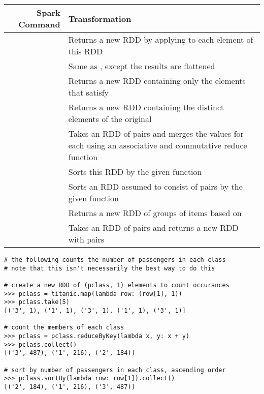 \begin{table}[H]
\begin{tabular}{|r|C|}
\hline
\textbf{Spark Command} & \textbf{Transformation} \\
\hline
{} &  Returns a new RDD by applying  to each element of this RDD \\
\hline
{} & Same as , except the results are flattened \\
\hline
{} & Returns a new RDD containing only the elements that satisfy  \\
\hline
{} & Returns a new RDD containing the distinct elements of the original\\
\hline
{} & Takes an RDD of  pairs and merges the values for each  using an associative and commutative reduce function  \\
\hline
{} & Sorts this RDD by the given function  \\
\hline
{} & Sorts an RDD assumed to consist of  pairs by the given function  \\
\hline
{} & Returns a new RDD of groups of items based on  \\
\hline
{} & Takes an RDD of  pairs and returns a new RDD with  pairs \\
\hline
\end{tabular}
\end{table}


\begin{lstlisting}
# the following counts the number of passengers in each class
# note that this isn't necessarily the best way to do this

# create a new RDD of (pclass, 1) elements to count occurances
>>> pclass = titanic.map(lambda row: (row[1], 1))
>>> pclass.take(5)
[('3', 1), ('1', 1), ('3', 1), ('1', 1), ('3', 1)]

# count the members of each class
>>> pclass = pclass.reduceByKey(lambda x, y: x + y)
>>> pclass.collect()
[('3', 487), ('1', 216), ('2', 184)]

# sort by number of passengers in each class, ascending order
>>> pclass.sortBy(lambda row: row[1]).collect()
[('2', 184), ('1', 216), ('3', 487)]
\end{lstlisting}

